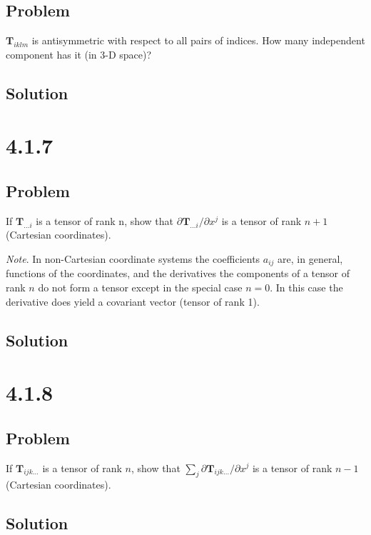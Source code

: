 \documentclass[12pt]{article}
\begin{document}
\subsection{Problem}

\(\textbf{T}_{iklm}\) is antisymmetric with respect to all pairs of indices. How many
independent component has it (in 3-D space)?

\subsection{Solution}

\section{4.1.7}

\subsection{Problem}

If \(\textbf{T}_{\ldots i}\) is a tensor of rank n, show that
\(\partial \textbf{T}_{\ldots i} / \partial x^j\) is a tensor of rank \(n + 1\)
(Cartesian coordinates).

\textit{Note}. In non-Cartesian coordinate systems the coefficients \(a_{ij}\) are, in general,
functions of the coordinates, and the derivatives the components of a tensor of rank \(n\) do
not form a tensor except in the special case \(n = 0\). In this case the derivative does yield a
covariant vector (tensor of rank 1).

\subsection{Solution}

\section{4.1.8}

\subsection{Problem}

If \(\textbf{T}_{ijk\ldots}\) is a tensor of rank \(n\), show that
\(\sum_j \partial \textbf{T}_{ijk\ldots}/\partial x^j\) is a tensor of rank \(n - 1\)
(Cartesian coordinates).

\subsection{Solution}
\end{document}
